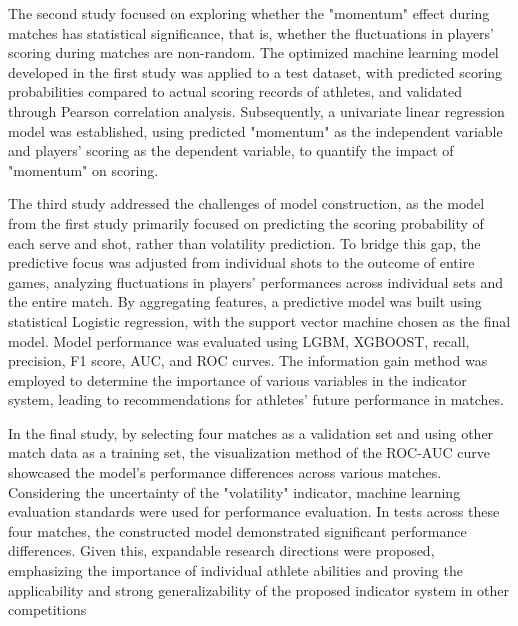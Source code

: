 \documentclass{article}
\begin{document}
The second study focused on exploring whether the "momentum" effect during matches has statistical significance, that is, whether the fluctuations in players' scoring during matches are non-random. The optimized machine learning model developed in the first study was applied to a test dataset, with predicted scoring probabilities compared to actual scoring records of athletes, and validated through Pearson correlation analysis. Subsequently, a univariate linear regression model was established, using predicted "momentum" as the independent variable and players' scoring as the dependent variable, to quantify the impact of "momentum" on scoring.

The third study addressed the challenges of model construction, as the model from the first study primarily focused on predicting the scoring probability of each serve and shot, rather than volatility prediction. To bridge this gap, the predictive focus was adjusted from individual shots to the outcome of entire games, analyzing fluctuations in players' performances across individual sets and the entire match. By aggregating features, a predictive model was built using statistical Logistic regression, with the support vector machine chosen as the final model. Model performance was evaluated using LGBM, XGBOOST, recall, precision, F1 score, AUC, and ROC curves. The information gain method was employed to determine the importance of various variables in the indicator system, leading to recommendations for athletes' future performance in matches.

In the final study, by selecting four matches as a validation set and using other match data as a training set, the visualization method of the ROC-AUC curve showcased the model's performance differences across various matches. Considering the uncertainty of the "volatility" indicator, machine learning evaluation standards were used for performance evaluation. In tests across these four matches, the constructed model demonstrated significant performance differences. Given this, expandable research directions were proposed, emphasizing the importance of individual athlete abilities and proving the applicability and strong generalizability of the proposed indicator system in other competitions
\end{document}
